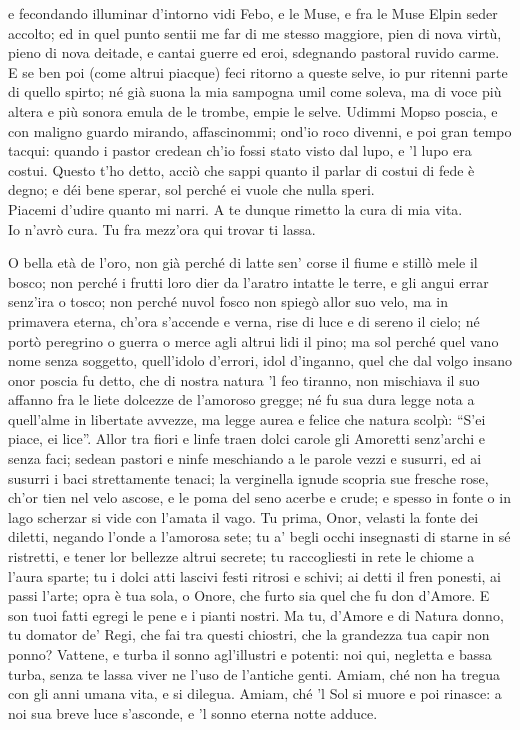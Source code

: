 \documentclass{book}
\begin{document}
	e fecondando illuminar d'intorno
	vidi Febo, e le Muse, e fra le Muse
	Elpin seder accolto; ed in quel punto
	sentii me far di me stesso maggiore,
	pien di nova virt\`u, pieno di nova
	deitade, e cantai guerre ed eroi,
	sdegnando pastoral ruvido carme.
	E se ben poi (come altrui piacque) feci
	ritorno a queste selve, io pur ritenni
	parte di quello spirto; n\'e gi\`a suona
	la mia sampogna umil come soleva,
	ma di voce pi\`u altera e pi\`u sonora
	emula de le trombe, empie le selve.
	Udimmi Mopso poscia, e con maligno
	guardo mirando, affascinommi; ond'io
	roco divenni, e poi gran tempo tacqui:
	quando i pastor credean ch'io fossi stato
	visto dal lupo, e 'l lupo era costui.
	Questo t'ho detto, acci\`o che sappi quanto
	il parlar di costui di fede \`e degno;
	e d\'ei bene sperar, sol perch\'e ei vuole
	che nulla speri. \\

   \4 Piacemi d'udire
	quanto mi narri. A te dunque rimetto
	la cura di mia vita. \\

   \5 Io n'avr\`o cura.
	Tu fra mezz'ora qui trovar ti lassa.

	\9 O bella et\`a de l'oro,
	non gi\`a perch\'e di latte
	sen' corse il fiume e still\`o mele il bosco;
	non perch\'e i frutti loro
	dier da l'aratro intatte
	le terre, e gli angui errar senz'ira o tosco;
	non perch\'e nuvol fosco
	non spieg\`o allor suo velo,
	ma in primavera eterna,
	ch'ora s'accende e verna,
	rise di luce e di sereno il cielo;
	n\'e port\`o peregrino
	o guerra o merce agli altrui lidi il pino;
	ma sol perch\'e quel vano
	nome senza soggetto,
	quell'idolo d'errori, idol d'inganno,
	quel che dal volgo insano
	onor poscia fu detto,
	che di nostra natura 'l feo tiranno,
	non mischiava il suo affanno
	fra le liete dolcezze
	de l'amoroso gregge;
	n\'e fu sua dura legge
	nota a quell'alme in libertate avvezze,
	ma legge aurea e felice
	che natura scolp\`{\i}: ``S'ei piace, ei lice''.
	Allor tra fiori e linfe
	traen dolci carole
	gli Amoretti senz'archi e senza faci;
	sedean pastori e ninfe
	meschiando a le parole
	vezzi e susurri, ed ai susurri i baci
	strettamente tenaci;
	la verginella ignude
	scopria sue fresche rose,
	ch'or tien nel velo ascose,
	e le poma del seno acerbe e crude;
	e spesso in fonte o in lago
	scherzar si vide con l'amata il vago.
	Tu prima, Onor, velasti
	la fonte dei diletti,
	negando l'onde a l'amorosa sete;
	tu a' begli occhi insegnasti
	di starne in s\'e ristretti,
	e tener lor bellezze altrui secrete;
	tu raccogliesti in rete
	le chiome a l'aura sparte;
	tu i dolci atti lascivi
	festi ritrosi e schivi;
	ai detti il fren ponesti, ai passi l'arte;
	opra \`e tua sola, o Onore,
	che furto sia quel che fu don d'Amore.
	E son tuoi fatti egregi
	le pene e i pianti nostri.
	Ma tu, d'Amore e di Natura donno,
	tu domator de' Regi,
	che fai tra questi chiostri,
	che la grandezza tua capir non ponno?
	Vattene, e turba il sonno
	agl'illustri e potenti:
	noi qui, negletta e bassa
	turba, senza te lassa
	viver ne l'uso de l'antiche genti.
	Amiam, ch\'e non ha tregua
	con gli anni umana vita, e si dilegua.
	Amiam, ch\'e 'l Sol si muore e poi rinasce:
	a noi sua breve luce
	s'asconde, e 'l sonno eterna notte adduce.
\end{document}
